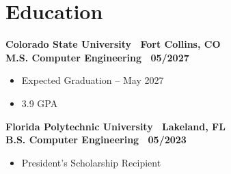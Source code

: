 \section{Education}

\textbf{Colorado State University \textbar\ Fort Collins, CO} \\
{\small\textbf{M.S. Computer Engineering \textbar\ 05/2027}}

\begin{itemize}
  \item Expected Graduation -- May 2027
  \item 3.9 GPA
\end{itemize}

\textbf{Florida Polytechnic University \textbar\ Lakeland, FL} \\
{\small\textbf{B.S. Computer Engineering \textbar\ 05/2023}}

\begin{itemize}
  \item President's Scholarship Recipient
\end{itemize}
